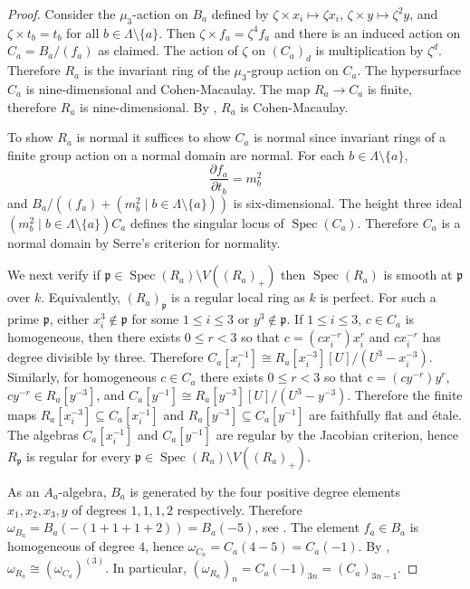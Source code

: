 \documentclass[reqno,11pt]{amsart}
\numberwithin{equation}{section}
\theoremstyle{definition}
\theoremstyle{definition}
\theoremstyle{definition}
\theoremstyle{remark}
\newcommand{\Spec}{\operatorname{Spec}}
\newcommand{\fp}{\mathfrak{p}}
\begin{document}
\begin{proof}
    Consider the $\mu_3$-action on $B_a$ defined by $\zeta\times x_i\mapsto \zeta x_i$, $\zeta\times y\mapsto \zeta^2y$, and $\zeta\times t_b = t_b$ for all $b\in\Lambda\setminus\{a\}$. Then $\zeta\times f_a = \zeta^4f_a$ and there is an induced action on $C_a = B_a/(f_a)$ as claimed. The action of $\zeta$ on $(C_a)_d$ is multiplication by $\zeta^d$. Therefore $R_a$ is the invariant ring of the $\mu_3$-group action on $C_a$. The hypersurface $C_a$ is nine-dimensional and Cohen-Macaulay. The map $R_a\to C_a$ is finite, therefore $R_a$ is nine-dimensional. By \cite[Proposition~13]{HE71}, $R_a$ is Cohen-Macaulay. 
    
    To show $R_a$ is normal it suffices to show $C_a$ is normal since invariant rings of a finite group action on a normal domain are normal. For each $b\in\Lambda\setminus\{a\}$, 
    \[
    \frac{\partial f_a}{\partial t_b} = m_b^2
    \]
    and $B_a/((f_a)+ (m_b^2\mid b\in\Lambda\setminus\{a\}))$ is six-dimensional. The height three ideal $\left(m_b^2\mid b\in\Lambda\setminus\{a\}\right)C_a$ defines the singular locus of $\Spec(C_a)$. Therefore $C_a$ is a normal domain by Serre's criterion for normality.  


    We next verify if $\fp\in \Spec(R_a)\setminus V((R_a)_+)$ then $\Spec(R_a)$ is smooth at $\fp$ over $k$. Equivalently, $(R_a)_{\fp}$ is a regular local ring as $k$ is perfect. For such a prime $\fp$, either $x_i^3\not\in \fp$ for some $1\leq i\leq 3$ or $y^3\not\in \fp$. If $1\leq i\leq 3$, $c\in C_a$ is homogeneous, then there exists $0\leq r<3$ so that $c = (cx_i^{-r})x_i^r$ and $cx_i^{-r}$ has degree divisible by three. Therefore $C_a[x_i^{-1}]\cong R_a[x_i^{-3}][U]/(U^3-x_i^{-3})$. Similarly, for homogeneous $c\in C_a$ there exists $0\leq r<3$ so that $c = (cy^{-r})y^r$, $cy^{-r}\in R_a[y^{-3}]$, and $C_a[y^{-1}]\cong R_a[y^{-3}][U]/(U^3-y^{-3})$. Therefore the finite maps $R_a[x_i^{-3}]\subseteq C_a[x_i^{-1}]$ and $R_a[y^{-3}]\subseteq C_a[y^{-1}]$ are faithfully flat and \'{e}tale. The algebras $C_a[x_i^{-1}]$ and $C_a[y^{-1}]$ are regular by the Jacobian criterion, hence $R_{\fp}$ is regular for every $\fp\in \Spec(R_a)\setminus V((R_a)_+)$.
    
    

    As an $A_a$-algebra, $B_a$ is generated by the four positive degree elements $x_1,x_2,x_3,y$ of degrees $1,1,1,2$ respectively. Therefore $\omega_{B_a} = B_a(-(1+1+1+2))=B_a(-5)$, see \cite[\S 3.6]{BrunsHerzog}. The element $f_a\in B_a$ is homogeneous of degree $4$, hence $\omega_{C_a} = C_a(4-5) = C_a(-1)$. By \cite[Corollary~3.1.3]{GW78}, $\omega_{R_a} \cong (\omega_{C_a})^{(3)}$. In particular, $(\omega_{R_a})_n = C_a(-1)_{3n} = (C_a)_{3n-1}$.


\end{proof}
\end{document}
